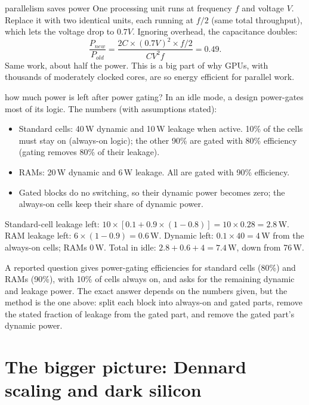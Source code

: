 \begin{worked}{parallelism saves power}
One processing unit runs at frequency $f$ and voltage $V$. Replace it with two identical units, each running at $f/2$ (same total throughput), which lets the voltage drop to $0.7V$. Ignoring overhead, the capacitance doubles:
\[
  \frac{P_{new}}{P_{old}} = \frac{2C \times (0.7V)^2 \times f/2}{C V^2 f} = 0.49.
\]
Same work, about half the power. This is a big part of why GPUs, with thousands of moderately clocked cores, are so energy efficient for parallel work.
\end{worked}

\begin{worked}{how much power is left after power gating?}
In an idle mode, a design power-gates most of its logic. The numbers (with assumptions stated):
\begin{itemize}
  \item Standard cells: 40\,W dynamic and 10\,W leakage when active. 10\% of the cells must stay on (always-on logic); the other 90\% are gated with 80\% efficiency (gating removes 80\% of their leakage).
  \item RAMs: 20\,W dynamic and 6\,W leakage. All are gated with 90\% efficiency.
  \item Gated blocks do no switching, so their dynamic power becomes zero; the always-on cells keep their share of dynamic power.
\end{itemize}
Standard-cell leakage left: $10 \times [0.1 + 0.9 \times (1 - 0.8)] = 10 \times 0.28 = 2.8$\,W.
RAM leakage left: $6 \times (1 - 0.9) = 0.6$\,W.
Dynamic left: $0.1 \times 40 = 4$\,W from the always-on cells; RAMs 0\,W.
Total in idle: $2.8 + 0.6 + 4 = 7.4$\,W, down from 76\,W.
\end{worked}

\begin{onoa}
A reported question gives power-gating efficiencies for standard cells (80\%) and RAMs (90\%), with 10\% of cells always on, and asks for the remaining dynamic and leakage power. The exact answer depends on the numbers given, but the method is the one above: split each block into always-on and gated parts, remove the stated fraction of leakage from the gated part, and remove the gated part's dynamic power.
\end{onoa}

\section{The bigger picture: Dennard scaling and dark silicon}

